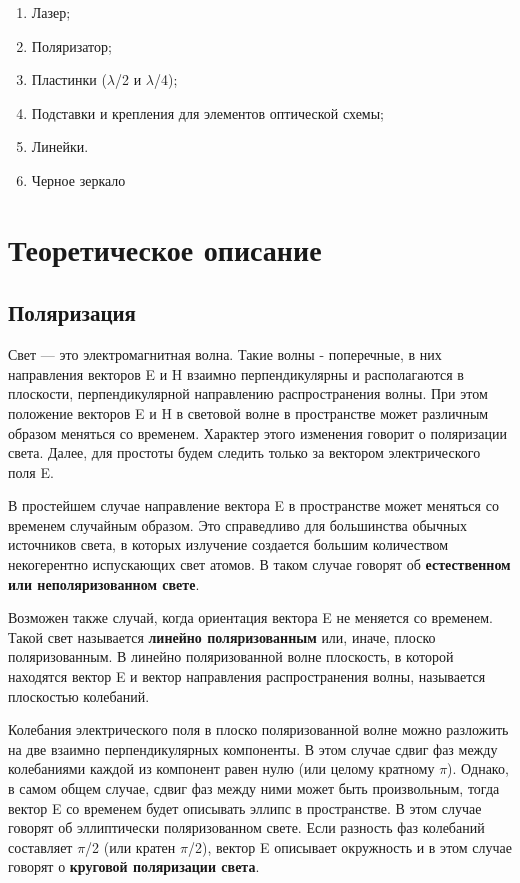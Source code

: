 \documentclass[a4paper, 12pt]{article}
\begin{document}
\begin{enumerate}

	\item Лазер;

	\item Поляризатор;

	\item Пластинки  ($\lambda$/2 и $\lambda$/4);

	\item Подставки и крепления для элементов оптической схемы;

	\item Линейки.

	\item Черное зеркало

\end{enumerate}

\section{Теоретическое описание}


\subsection{Поляризация}
Свет — это электромагнитная волна. Такие волны - поперечные, в них направления векторов E и H взаимно перпендикулярны и располагаются в плоскости, перпендикулярной направлению распространения волны. При этом положение векторов E и H в световой волне в пространстве может различным образом меняться со временем. Характер этого изменения говорит о поляризации света. Далее, для простоты будем следить только за вектором электрического поля E.


В простейшем случае направление вектора E в пространстве может меняться со временем случайным образом. Это справедливо для большинства обычных источников света, в которых излучение создается большим количеством некогерентно испускающих свет атомов. В таком случае говорят об \textbf{естественном или неполяризованном свете}.


Возможен также случай, когда ориентация вектора E не меняется со временем. Такой свет называется \textbf{линейно поляризованным} или, иначе, плоско поляризованным. В линейно поляризованной волне плоскость, в которой находятся вектор E и вектор направления распространения волны, называется плоскостью колебаний.


Колебания электрического поля в плоско поляризованной волне можно разложить на две взаимно перпендикулярных компоненты. В этом случае сдвиг фаз между колебаниями каждой из компонент равен нулю (или целому кратному $\pi$). Однако, в самом общем случае, сдвиг фаз между ними может быть произвольным, тогда вектор E со временем будет описывать эллипс в пространстве. В этом случае говорят об эллиптически поляризованном свете. Если разность фаз колебаний составляет $\pi$/2 (или кратен $\pi$/2), вектор E описывает окружность и в этом случае говорят о \textbf{круговой поляризации света}. 
\end{document}
